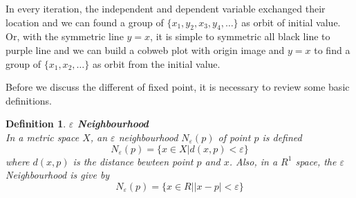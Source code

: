 \documentclass[12pt]{article}
\theoremstyle{plain}
\newtheorem{definition}{{\color{red}\textbf{Definition}}}[section]
\begin{document}
In every iteration, the independent and dependent variable exchanged their location and we can found a group of $\{x_1, y_2, x_3, y_4, \ldots\}$ as orbit of initial value. Or, with the symmetric line $y = x$, it is simple to symmetric all black line to purple line and we can build a cobweb plot with origin image and $y = x$ to find a group of $\{x_1, x_2, \ldots\}$ as orbit from the initial value.

Before we discuss the different of fixed point, it is necessary to review some basic definitions.

\begin{definition}\textbf{$\varepsilon$ Neighbourhood}
\\\noindent In a metric space $X$, an $\varepsilon$ neighbourhood $N_\varepsilon(p)$ of point $p$ is defined 
$$
N_\varepsilon(p) = \{x \in X | d(x, p) < \varepsilon\}
$$
where $d(x, p)$ is the distance bewteen point $p$ and $x$. Also, in a $R^1$ space, the $\varepsilon$ Neighbourhood is give by
$$
N_\varepsilon(p) = \{x \in R | |x-p| < \varepsilon\}
$$
\end{definition}


\newpage
\end{document}
